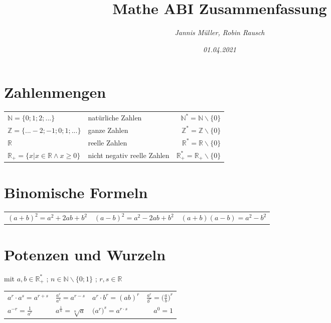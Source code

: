 \documentclass[a4paper, 15pt]{article}
\title{Mathe ABI Zusammenfassung}
\date{\slshape 01.04.2021}
\author{\slshape Jannis Müller, Robin Rausch}
\begin{document}
\maketitle
\tableofcontents
\newpage
\section{Zahlenmengen}
\begin{table} [h]
\begin{tabularx}{\textwidth}{ X X r }
  $\mathbb{N} = \{0; 1; 2; ...\}$ & natürliche Zahlen & $\mathbb{N}^* = \mathbb{N}\backslash\{0\}$\\[0.2cm] 
  $\mathbb{Z} = \{... -2; -1; 0; 1; ...\}$ & ganze Zahlen & $\mathbb{Z}^* = \mathbb{Z}\backslash\{0\}$\\[0.2cm]  
  $\mathbb{R}$ & reelle Zahlen & $\mathbb{R}^* = \mathbb{R}\backslash\{0\}$\\[0.2cm]  
  $\mathbb{R}_+ = \{x|x \in \mathbb{R} \land x \geq0 \}$ & nicht negativ reelle Zahlen & $\mathbb{R}^*_+ = \mathbb{R}_+\backslash\{0\}$\\
\end{tabularx}
\end{table}
\section{Binomische Formeln}
\begin{table} [h]
\begin{tabularx}{\textwidth}{ X X r }
  $(a+b)^2 = a^2+2ab+b^2$ & $(a-b)^2 = a^2-2ab+b^2$ & $(a+b)(a-b) = a^2 - b^2$
\end{tabularx}
\end{table}
\section{Potenzen und Wurzeln}
mit $a,b \in \mathbb{R}^*_+$ ; $n \in \mathbb{N} \backslash \{0;1\}$ ; $r,s \in \mathbb{R}$
\begin{table} [h]
\Large
\begin{tabularx}{\textwidth}{ X X X r }
$a^r \cdot a^s = a^{r+s}$ & $\frac{a^r}{a^s} = a^{r-s}$ & $a^r \cdot b^r = (ab)^r$ & $\frac{a^r}{b^r} =\Big(\frac{a}{b}\Big)^r$\\ [0.4cm] 
$a^{-r} = \frac{1}{a^r}$ & $a^{\frac{1}{n}} = \sqrt[n]{a}$ & $\big(a^r\big)^s = a^{r \cdot s}$ & $a^0 = 1$
\end{tabularx}
\end{table}
\end{document}
